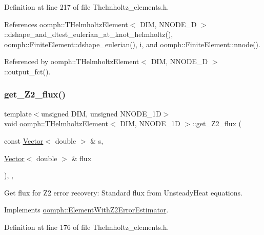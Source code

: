 Definition at line 217 of file Thelmholtz\+\_\+elements.\+h.



References oomph\+::\+T\+Helmholtz\+Element$<$ D\+I\+M, N\+N\+O\+D\+E\+\_\+D $>$\+::dshape\+\_\+and\+\_\+dtest\+\_\+eulerian\+\_\+at\+\_\+knot\+\_\+helmholtz(), oomph\+::\+Finite\+Element\+::dshape\+\_\+eulerian(), i, and oomph\+::\+Finite\+Element\+::nnode().



Referenced by oomph\+::\+T\+Helmholtz\+Element$<$ D\+I\+M, N\+N\+O\+D\+E\+\_\+D $>$\+::output\+\_\+fct().

\mbox{\label{classoomph_1_1THelmholtzElement_a3dd24eadad0eb550d205d5438f042748}} 
\subsubsection{\texorpdfstring{get\+\_\+\+Z2\+\_\+flux()}{get\_Z2\_flux()}}
{\footnotesize\ttfamily template$<$unsigned D\+IM, unsigned N\+N\+O\+D\+E\+\_\+1D$>$ \\
void \hyperlink{classoomph_1_1THelmholtzElement}{oomph\+::\+T\+Helmholtz\+Element}$<$ D\+IM, N\+N\+O\+D\+E\+\_\+1D $>$\+::get\+\_\+\+Z2\+\_\+flux (\begin{DoxyParamCaption}\item[{const \hyperlink{classoomph_1_1Vector}{Vector}$<$ double $>$ \&}]{s,  }\item[{\hyperlink{classoomph_1_1Vector}{Vector}$<$ double $>$ \&}]{flux }\end{DoxyParamCaption})\hspace{0.3cm}{\ttfamily [inline]}, {\ttfamily [protected]}, {\ttfamily [virtual]}}



Get \textquotesingle{}flux\textquotesingle{} for Z2 error recovery\+: Standard flux from Unsteady\+Heat equations. 



Implements \hyperlink{classoomph_1_1ElementWithZ2ErrorEstimator_a5688ff5f546d81771cabad82ca5a7556}{oomph\+::\+Element\+With\+Z2\+Error\+Estimator}.



Definition at line 176 of file Thelmholtz\+\_\+elements.\+h.



